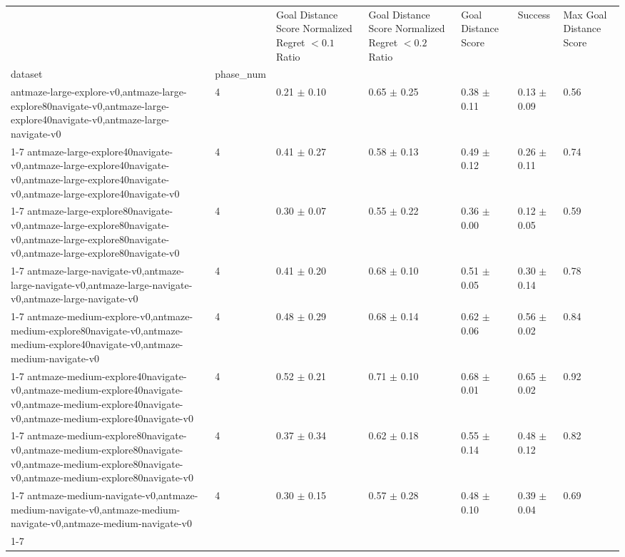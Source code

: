 \begin{tabular}{lllllll}
\toprule
 &  & Goal Distance Score Normalized Regret $< 0.1$ Ratio & Goal Distance Score Normalized Regret $< 0.2$ Ratio & Goal Distance Score & Success & Max Goal Distance Score \\
dataset & phase_num &  &  &  &  &  \\
\midrule
antmaze-large-explore-v0,antmaze-large-explore80navigate-v0,antmaze-large-explore40navigate-v0,antmaze-large-navigate-v0 & 4 & 0.21 $\pm$ 0.10 & 0.65 $\pm$ 0.25 & 0.38 $\pm$ 0.11 & 0.13 $\pm$ 0.09 & 0.56 \\
\cline{1-7}
antmaze-large-explore40navigate-v0,antmaze-large-explore40navigate-v0,antmaze-large-explore40navigate-v0,antmaze-large-explore40navigate-v0 & 4 & 0.41 $\pm$ 0.27 & 0.58 $\pm$ 0.13 & 0.49 $\pm$ 0.12 & 0.26 $\pm$ 0.11 & 0.74 \\
\cline{1-7}
antmaze-large-explore80navigate-v0,antmaze-large-explore80navigate-v0,antmaze-large-explore80navigate-v0,antmaze-large-explore80navigate-v0 & 4 & 0.30 $\pm$ 0.07 & 0.55 $\pm$ 0.22 & 0.36 $\pm$ 0.00 & 0.12 $\pm$ 0.05 & 0.59 \\
\cline{1-7}
antmaze-large-navigate-v0,antmaze-large-navigate-v0,antmaze-large-navigate-v0,antmaze-large-navigate-v0 & 4 & 0.41 $\pm$ 0.20 & 0.68 $\pm$ 0.10 & 0.51 $\pm$ 0.05 & 0.30 $\pm$ 0.14 & 0.78 \\
\cline{1-7}
antmaze-medium-explore-v0,antmaze-medium-explore80navigate-v0,antmaze-medium-explore40navigate-v0,antmaze-medium-navigate-v0 & 4 & 0.48 $\pm$ 0.29 & 0.68 $\pm$ 0.14 & 0.62 $\pm$ 0.06 & 0.56 $\pm$ 0.02 & 0.84 \\
\cline{1-7}
antmaze-medium-explore40navigate-v0,antmaze-medium-explore40navigate-v0,antmaze-medium-explore40navigate-v0,antmaze-medium-explore40navigate-v0 & 4 & 0.52 $\pm$ 0.21 & 0.71 $\pm$ 0.10 & 0.68 $\pm$ 0.01 & 0.65 $\pm$ 0.02 & 0.92 \\
\cline{1-7}
antmaze-medium-explore80navigate-v0,antmaze-medium-explore80navigate-v0,antmaze-medium-explore80navigate-v0,antmaze-medium-explore80navigate-v0 & 4 & 0.37 $\pm$ 0.34 & 0.62 $\pm$ 0.18 & 0.55 $\pm$ 0.14 & 0.48 $\pm$ 0.12 & 0.82 \\
\cline{1-7}
antmaze-medium-navigate-v0,antmaze-medium-navigate-v0,antmaze-medium-navigate-v0,antmaze-medium-navigate-v0 & 4 & 0.30 $\pm$ 0.15 & 0.57 $\pm$ 0.28 & 0.48 $\pm$ 0.10 & 0.39 $\pm$ 0.04 & 0.69 \\
\cline{1-7}
\bottomrule
\end{tabular}
